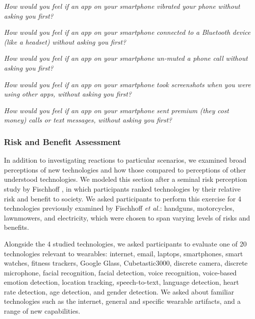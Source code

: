 \begin{packed_enum}
\item \textit{How would you feel if an app on your smartphone vibrated your phone without asking you first?}
\item \textit{How would you feel if an app on your smartphone connected to a Bluetooth device (like a headset) without asking you first?}
\item \textit{How would you feel if an app on your smartphone un-muted a phone call without asking you first?}
\item \textit{How would you feel if an app on your smartphone took screenshots when you were using other apps, without asking you first?}
\item \textit{How would you feel if an app on your smartphone sent premium (they cost money) calls or text messages, without asking you first?} 
\end{packed_enum}

\subsubsection{Risk and Benefit Assessment}
In addition to investigating reactions to particular scenarios, we examined broad perceptions of new technologies and how those compared to perceptions of other understood technologies. We modeled this section after a seminal risk perception study by Fischhoff \etal\cite{Fischhoff}, in which participants ranked technologies by their relative risk and benefit to society. We asked participants to perform this exercise for 4 technologies previously examined by Fischhoff {\it et al.}: handguns, motorcycles, lawnmowers, and electricity, which were chosen to span varying levels of risks and benefits.

Alongside the 4 studied technologies, we asked participants to evaluate one of 20 technologies relevant to wearables: internet, email, laptops, smartphones, smart watches, fitness trackers, Google Glass, Cubetastic3000, discrete camera, discrete microphone, facial recognition, facial detection, voice recognition, voice-based emotion detection, location tracking, speech-to-text, language detection, heart rate detection, age detection, and gender detection. We asked about familiar technologies such as the internet, general and specific wearable artifacts, and a range of new capabilities. 


